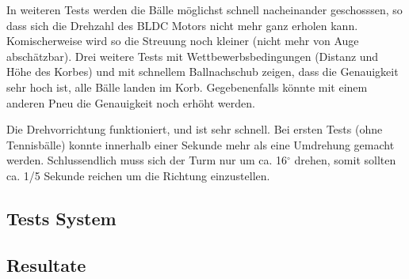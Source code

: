In weiteren Tests werden die Bälle möglichst schnell nacheinander geschosssen, so dass sich die Drehzahl des BLDC Motors nicht mehr ganz erholen kann. Komischerweise wird so die Streuung noch kleiner (nicht mehr von Auge abschätzbar). Drei weitere Tests mit Wettbewerbsbedingungen (Distanz und Höhe des Korbes) und mit schnellem Ballnachschub zeigen, dass die Genauigkeit sehr hoch ist, alle Bälle landen im Korb. Gegebenenfalls könnte mit einem anderen Pneu die Genauigkeit noch erhöht werden.

Die Drehvorrichtung funktioniert, und ist sehr schnell. Bei ersten Tests (ohne Tennisbälle) konnte innerhalb einer Sekunde mehr als eine Umdrehung gemacht werden. Schlussendlich muss sich der Turm nur um ca. 16$^\circ$ drehen, somit sollten ca. 1/5 Sekunde reichen um die Richtung einzustellen.



\subsection{Tests System}

\subsection{Resultate}

